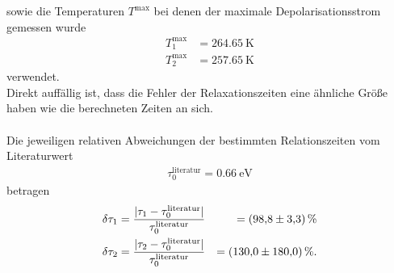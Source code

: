 sowie die Temperaturen $T^\text{max}$ bei denen der maximale Depolarisationsstrom gemessen wurde
\\
\begin{align*}
  T^\text{max}_{1} &= \SI{264.65}{\kelvin}\\
  T^\text{max}_{2} &= \SI{257.65}{\kelvin}
\end{align*}
verwendet.\\
Direkt auffällig ist, dass die Fehler der Relaxationszeiten eine ähnliche
Größe haben wie die berechneten Zeiten an sich.\\ \\
Die jeweiligen relativen Abweichungen der bestimmten Relationszeiten vom Literaturwert \cite{literaturwert}
\begin{align*}
  \tau_{0}^\text{literatur} = \SI{0.66}{\electronvolt}
\end{align*}
betragen
\begin{align*}
  \delta \tau_{1} &= \frac{\lvert \tau_{1} - \tau_{0}^\text{literatur} \rvert}{\tau_{0}^\text{literatur}} &= \SI{98.8+-3.3}{\percent}\\
  \delta \tau_{2} &= \frac{\lvert \tau_{2} - \tau_{0}^\text{literatur} \rvert}{\tau_{0}^\text{literatur}} &= \SI{130.+-180}{\percent} .
\end{align*}
